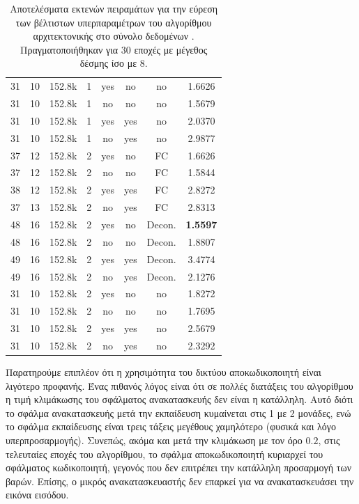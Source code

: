 \begin{table}[H]
\begin{center}
{\begin{tabular}{c c c c c c c c}
            31 & 10 & 152.8k & 1 & yes & no & no & 1.6626 \\%
            31 & 10 & 152.8k & 1 & no & no & no & 1.5679 \\%
            31 & 10 & 152.8k & 1 & yes & yes & no & 2.0370 \\
            31 & 10 & 152.8k & 1 & no & yes & no & 2.9877 \\
            \midrule
            37 & 12 & 152.8k & 2 & yes & no & FC & 1.6626\\ %
            37 & 12 & 152.8k & 2 & no & no & FC & 1.5844\\%
            38 & 12 & 152.8k & 2 & yes & yes & FC & 2.8272 \\
            37 & 13 & 152.8k & 2 & no & yes & FC & 2.8313 \\

            48 & 16 & 152.8k & 2 & yes & no & Decon. & \textbf{1.5597} \\ %
            48 & 16 & 152.8k & 2 & no & no & Decon. & 1.8807 \\ %
            49 & 16 & 152.8k & 2 & yes & yes & Decon. & 3.4774 \\
            49 & 16 & 152.8k & 2 & no & yes & Decon. & 2.1276  \\

            31 & 10 & 152.8k & 2 & yes & no & no & 1.8272 \\ %
            31 & 10 & 152.8k & 2 & no & no & no & 1.7695\\ %
            31 & 10 & 152.8k & 2 & yes & yes & no & 2.5679 \\
            31 & 10 & 152.8k & 2 & no & yes & no & 2.3292 \\

            \bottomrule
        \end{tabular}
        }
    \end{center}
    \caption[]{\label{tab:method_3_hyper_tuning_RoWSS}Αποτελέσματα εκτενών πειραμάτων για την εύρεση των βέλτιστων υπερπαραμέτρων του αλγορίθμου  αρχιτεκτονικής  στο σύνολο δεδομένων . Πραγματοποιήθηκαν για 30 εποχές με μέγεθος δέσμης ίσο με 8.} 
\end{table}


Παρατηρούμε επιπλέον ότι η χρησιμότητα του δικτύου αποκωδικοποιητή είναι λιγότερο προφανής. Ένας πιθανός λόγος είναι ότι σε πολλές διατάξεις του αλγορίθμου η τιμή κλιμάκωσης του σφάλματος ανακατασκευής δεν είναι η κατάλληλη. Αυτό διότι το σφάλμα ανακατασκευής μετά την εκπαίδευση κυμαίνεται στις 1 με 2 μονάδες, ενώ το σφάλμα εκπαίδευσης είναι τρεις τάξεις μεγέθους χαμηλότερο (φυσικά και λόγο υπερπροσαρμογής). Συνεπώς, ακόμα και μετά την κλιμάκωση με τον όρο $0.2$, στις τελευταίες εποχές του αλγορίθμου, το σφάλμα αποκωδικοποιητή κυριαρχεί του σφάλματος κωδικοποιητή, γεγονός που δεν επιτρέπει την κατάλληλη προσαρμογή των βαρών. Επίσης, ο μικρός ανακατασκευαστής  δεν επαρκεί για να ανακατασκευάσει την εικόνα εισόδου.\par

